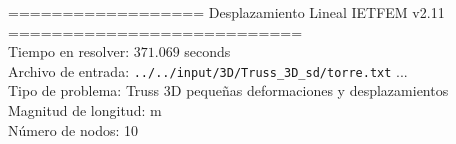 \documentclass[a4paper,11pt]{article}
\begin{document}

================== Desplazamiento Lineal IETFEM v2.11 ===========================\\


Tiempo en resolver: $371.069$ seconds \\

Archivo de entrada: \verb|../../input/3D/Truss_3D_sd/torre.txt|  ... \\

Tipo de problema: Truss 3D pequeñas deformaciones y desplazamientos\\ 

Magnitud de longitud: m \\

Número de nodos: 10 \\

\newpage       
\end{document}
